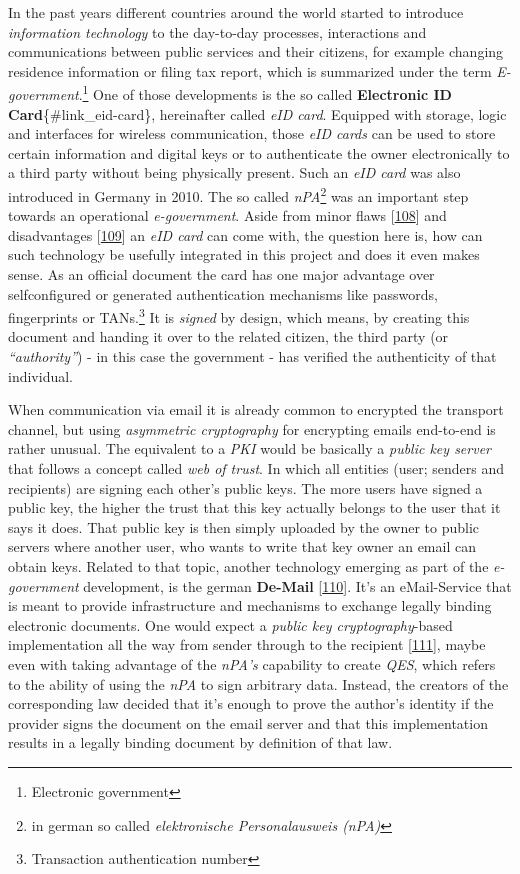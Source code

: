\documentclass[12pt,english,a4paper,titlepage,cleardoublepage=empty,dottedtoc]{report}
\begin{document}
In the past years different countries around the world started to
introduce \emph{information technology} to the day-to-day processes,
interactions and communications between public services and their
citizens, for example changing residence information or filing tax
report, which is summarized under the term
\emph{E-government}.\footnote{Electronic government} One of those
developments is the so called \textbf{Electronic ID
Card}\{\#link\_eid-card\}, hereinafter called \emph{eID card}. Equipped
with storage, logic and interfaces for wireless communication, those
\emph{eID cards} can be used to store certain information and digital
keys or to authenticate the owner electronically to a third party
without being physically present. Such an \emph{eID card} was also
introduced in Germany in 2010. The so called \emph{nPA}\footnote{in
  german so called \emph{elektronische Personalausweis (nPA)}} was an
important step towards an operational \emph{e-government}. Aside from
minor flaws
{[}\protect\hyperlink{ref-web_2013_npa-sicherheitsdefizit}{108}{]} and
disadvantages
{[}\protect\hyperlink{ref-web_2014_test-qes-support-in-npa}{109}{]} an
\emph{eID card} can come with, the question here is, how can such
technology be usefully integrated in this project and does it even makes
sense. As an official document the card has one major advantage over
selfconfigured or generated authentication mechanisms like passwords,
fingerprints or TANs.\footnote{Transaction authentication number} It is
\emph{signed} by design, which means, by creating this document and
handing it over to the related citizen, the third party (or
\emph{``authority''}) - in this case the government - has verified the
authenticity of that individual.

When communication via email it is already common to encrypted the
transport channel, but using \emph{asymmetric cryptography} for
encrypting emails end-to-end is rather unusual. The equivalent to a
\emph{PKI} would be basically a \emph{public key server} that follows a
concept called \emph{web of trust}. In which all entities (user; senders
and recipients) are signing each other's public keys. The more users
have signed a public key, the higher the trust that this key actually
belongs to the user that it says it does. That public key is then simply
uploaded by the owner to public servers where another user, who wants to
write that key owner an email can obtain keys. Related to that topic,
another technology emerging as part of the \emph{e-government}
development, is the german \textbf{De-Mail}
{[}\protect\hyperlink{ref-web_2017_about-de-mail}{110}{]}. It's an
eMail-Service that is meant to provide infrastructure and mechanisms to
exchange legally binding electronic documents. One would expect a
\emph{public key cryptography}-based implementation all the way from
sender through to the recipient
{[}\protect\hyperlink{ref-statement_2013_de-mail}{111}{]}, maybe even
with taking advantage of the \emph{nPA's} capability to create
\emph{QES}, which refers to the ability of using the \emph{nPA} to sign
arbitrary data. Instead, the creators of the corresponding law decided
that it's enough to prove the author's identity if the provider signs
the document on the email server and that this implementation results in
a legally binding document by definition of that law.
\end{document}
